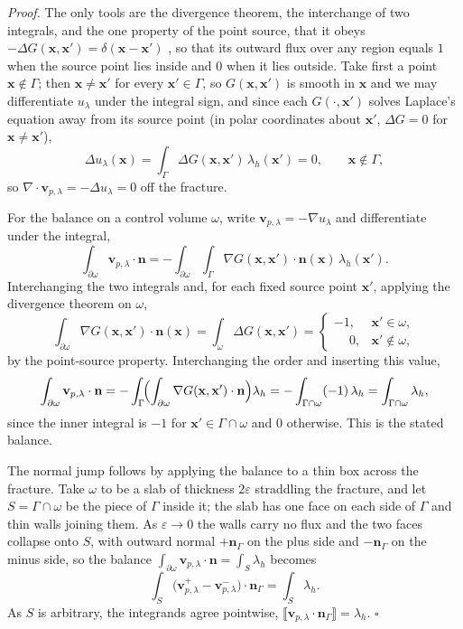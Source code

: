 \documentclass[a4paper,fleqn]{cas-sc}
\newcommand{\jump}[1]{\lBrack #1 \rBrack}
\newcommand{\vflux}{\mathbf{v}}
\begin{document}
\noindent\emph{Proof.} The only tools are the divergence theorem, the interchange
of two integrals, and the one property of the point source, that it obeys
\(-\Delta G(\mathbf{x},\mathbf{x}')=\delta(\mathbf{x}-\mathbf{x}')\)
\citep[\S2.2]{Evans2010}, so that its outward flux over any region equals \(1\)
when the source point lies inside and \(0\) when it lies outside. Take first a
point \(\mathbf{x}\notin\Gamma\); then \(\mathbf{x}\neq\mathbf{x}'\) for every
\(\mathbf{x}'\in\Gamma\), so \(G(\mathbf{x},\mathbf{x}')\) is smooth in
\(\mathbf{x}\) and we may differentiate \(u_\lambda\) under the integral sign, and
since each \(G(\cdot,\mathbf{x}')\) solves Laplace's equation away from its source
point (in polar coordinates about \(\mathbf{x}'\), \(\Delta G=0\) for
\(\mathbf{x}\neq\mathbf{x}'\)),
\[
  \Delta u_\lambda(\mathbf{x})
  =
  \int_\Gamma \Delta G(\mathbf{x},\mathbf{x}')\,\lambda_h(\mathbf{x}')=0 ,
  \qquad \mathbf{x}\notin\Gamma ,
\]
so \(\nabla\cdot\vflux_{p,\lambda}=-\Delta u_\lambda=0\) off the fracture.

For the balance on a control volume \(\omega\), write
\(\vflux_{p,\lambda}=-\nabla u_\lambda\) and differentiate under the integral,
\[
  \int_{\partial\omega}\vflux_{p,\lambda}\cdot\mathbf{n}
  =
  -\int_{\partial\omega}\!\int_\Gamma
  \nabla G(\mathbf{x},\mathbf{x}')\cdot\mathbf{n}(\mathbf{x})\,
  \lambda_h(\mathbf{x}') .
\]
Interchanging the two integrals and, for each fixed source point \(\mathbf{x}'\),
applying the divergence theorem on \(\omega\),
\[
  \int_{\partial\omega}
  \nabla G(\mathbf{x},\mathbf{x}')\cdot\mathbf{n}(\mathbf{x})
  =
  \int_\omega \Delta G(\mathbf{x},\mathbf{x}')
  =
  \begin{cases}
    -1, & \mathbf{x}'\in\omega,\\[2pt]
    \phantom{-}0, & \mathbf{x}'\notin\omega,
  \end{cases}
\]
by the point-source property. Interchanging the order and inserting this value,
\[
  \int_{\partial\omega}\vflux_{p,\lambda}\cdot\mathbf{n}
  =
  -\int_\Gamma\!\Bigl(\int_{\partial\omega}
  \nabla G(\mathbf{x},\mathbf{x}')\cdot\mathbf{n}\Bigr)\lambda_h
  =
  -\int_{\Gamma\cap\omega}(-1)\,\lambda_h
  =
  \int_{\Gamma\cap\omega}\lambda_h ,
\]
since the inner integral is \(-1\) for \(\mathbf{x}'\in\Gamma\cap\omega\) and \(0\)
otherwise. This is the stated balance.

The normal jump follows by applying the balance to a thin box across the fracture.
Take \(\omega\) to be a slab of thickness \(2\varepsilon\) straddling the fracture,
and let \(S=\Gamma\cap\omega\) be the piece of \(\Gamma\) inside it; the slab has
one face on each side of \(\Gamma\) and thin walls joining them. As
\(\varepsilon\to0\) the walls carry no flux and the two faces collapse onto
\(S\), with outward normal \(+\mathbf{n}_\Gamma\) on the plus side and
\(-\mathbf{n}_\Gamma\) on the minus side, so the balance
\(\int_{\partial\omega}\vflux_{p,\lambda}\cdot\mathbf{n}=\int_S\lambda_h\) becomes
\[
  \int_S\bigl(\vflux_{p,\lambda}^{+}-\vflux_{p,\lambda}^{-}\bigr)\cdot\mathbf{n}_\Gamma
  =\int_S\lambda_h .
\]
As \(S\) is arbitrary, the integrands agree pointwise,
\(\jump{\vflux_{p,\lambda}\cdot\mathbf{n}_\Gamma}=\lambda_h\). \(\square\)
\end{document}
